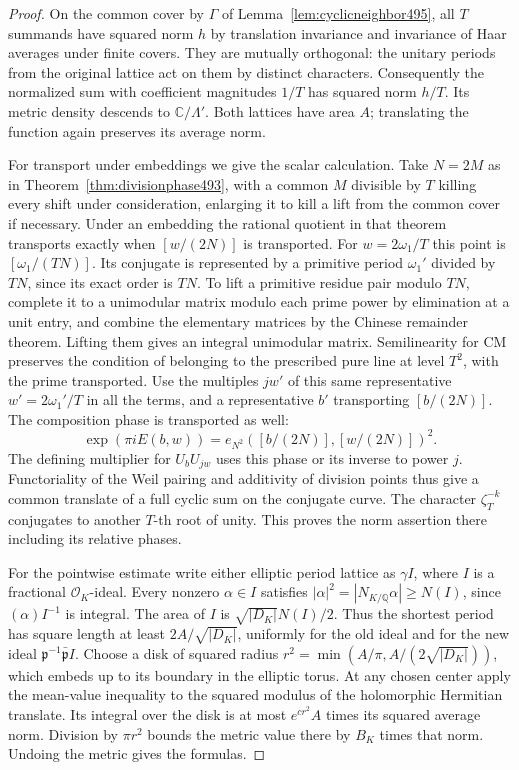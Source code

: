 \documentclass[a4paper,11pt]{article}
\theoremstyle{definition}
\theoremstyle{remark}
\numberwithin{equation}{section}
\begin{document}
\begin{proof}
On the common cover by \(\Gamma\) of
Lemma~\ref{lem:cyclicneighbor495}, all \(T\) summands have
squared norm \(h\) by translation invariance and invariance of
Haar averages under finite covers. They are mutually orthogonal:
the unitary periods from the original lattice act on them by
distinct characters. Consequently the normalized sum with
coefficient magnitudes \(1/T\) has squared norm \(h/T\).
Its metric density descends to \(\mathbb C/\Lambda'\).
Both lattices have area \(A\); translating the function again
preserves its average norm.

For transport under embeddings we give the scalar calculation.
Take \(N=2M\) as in Theorem~\ref{thm:divisionphase493}, with a
common \(M\) divisible by \(T\) killing every shift under
consideration, enlarging it to kill a lift from the common
cover if necessary. Under an embedding the rational quotient
in that theorem transports exactly when \([w/(2N)]\) is
transported. For \(w=2\omega_1/T\) this point is
\([\omega_1/(TN)]\). Its conjugate is represented by a primitive
period \(\omega_1'\) divided by \(TN\), since its exact order
is \(TN\). To lift a primitive residue pair modulo \(TN\),
complete it to a unimodular matrix modulo each prime power by
elimination at a unit entry, and combine the elementary matrices
by the Chinese remainder theorem. Lifting them gives an
integral unimodular matrix. Semilinearity for CM preserves
the condition of belonging to the prescribed pure line at
level \(T^2\), with the prime transported. Use the multiples
\(jw'\) of this same representative \(w'=2\omega_1'/T\) in
all the terms, and a representative \(b'\) transporting
\([b/(2N)]\). The composition phase is transported as well:
\[
       \exp(\pi i E(b,w))
           =e_{N^2}([b/(2N)],[w/(2N)])^2 .
\]
The defining multiplier for \(U_bU_{jw}\) uses this phase or
its inverse to power \(j\). Functoriality of the Weil pairing
and additivity of division points thus give a common translate
of a full cyclic sum on the conjugate curve. The character
\(\zeta_T^{-k}\) conjugates to another \(T\)-th root of unity.
This proves the norm assertion there including its relative
phases.

For the pointwise estimate write either elliptic period lattice
as \(\gamma I\), where \(I\) is a fractional \(\mathcal O_K\)-ideal.
Every nonzero \(\alpha\in I\) satisfies
\(|\alpha|^2=|N_{K/\mathbb Q}\alpha|\ge N(I)\), since
\((\alpha)I^{-1}\) is integral. The area of \(I\) is
\(\sqrt{|D_K|}N(I)/2\). Thus the shortest period has square
length at least \(2A/\sqrt{|D_K|}\), uniformly for the old
ideal and for the new ideal
\(\mathfrak p^{-1}\bar{\mathfrak p}I\).
Choose a disk of squared radius
\(r^2=\min(A/\pi,A/(2\sqrt{|D_K|}))\), which embeds up to its
boundary in the elliptic torus. At any chosen center apply the
mean-value inequality to the squared modulus of the holomorphic
Hermitian translate. Its integral over the disk is at most
\(e^{cr^2}A\) times its squared average norm. Division by
\(\pi r^2\) bounds the metric value there by \(B_K\) times that
norm. Undoing the metric gives the formulas.
\end{proof}
\end{document}
